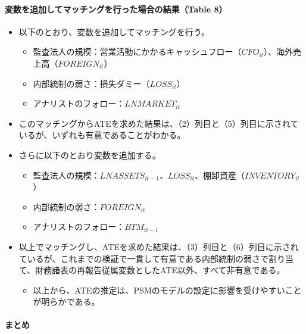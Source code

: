 \paragraph{変数を追加してマッチングを行った場合の結果（Table 8）}

\begin{itemize}
 \item 以下のとおり、変数を追加してマッチングを行う。
  \begin{itemize}
   \item 監査法人の規模：営業活動にかかるキャッシュフロー（$\mathit{CFO}_{it}$）、海外売上高（$\mathit{FOREIGN}_{it}$）
   \item 内部統制の弱さ：損失ダミー（$\mathit{LOSS}_{it}$）
   \item アナリストのフォロー：$\mathit{LNMARKET}_{it}$
  \end{itemize}
 \item このマッチングからATEを求めた結果は、（2）列目と（5）列目に示されているが、いずれも有意であることがわかる。
 \item さらに以下のとおり変数を追加する。
  \begin{itemize}
   \item 監査法人の規模：$\mathit{LNASSETS}_{it-1}$、$LOSS_{it}$、棚卸資産（$\mathit{INVENTORY}_{it}$）
   \item 内部統制の弱さ：$\mathit{FOREIGN}_{it}$
   \item アナリストのフォロー：$\mathit{BTM}_{it-1}$
  \end{itemize}
 \item 以上でマッチングし、ATEを求めた結果は、（3）列目と（6）列目に示されているが、これまでの検証で一貫して有意である内部統制の弱さで割り当て、財務諸表の再報告従属変数としたATE以外、すべて非有意である。
  \begin{itemize}
   \item 以上から、ATEの推定は、PSMのモデルの設定に影響を受けやすいことが明らかである。
  \end{itemize}
\end{itemize}

\paragraph{まとめ}
